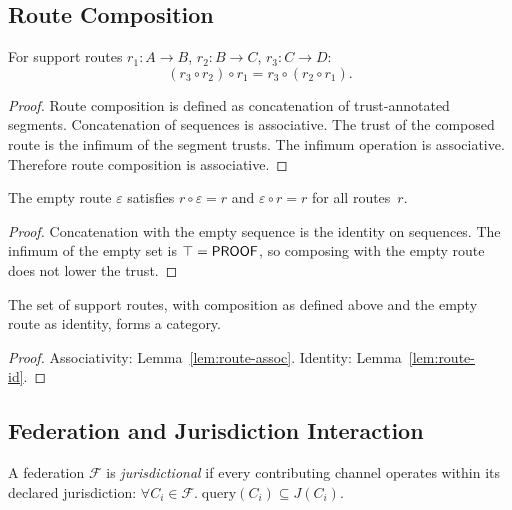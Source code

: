 \documentclass[11pt]{article}
\begin{document}
\subsection{Route Composition}
\label{app:route-comp}

\begin{lemma}
\label{lem:route-assoc}
For support routes $r_1 : A \to B$, $r_2 : B \to C$, $r_3 : C \to D$:
\[
  (r_3 \circ r_2) \circ r_1 = r_3 \circ (r_2 \circ r_1).
\]
\end{lemma}

\begin{proof}
Route composition is defined as concatenation of trust-annotated
segments.  Concatenation of sequences is associative.  The trust
of the composed route is the infimum of the segment trusts.  The
infimum operation is associative.  Therefore route composition is
associative.
\end{proof}

\begin{lemma}
\label{lem:route-id}
The empty route $\varepsilon$ satisfies $r \circ \varepsilon = r$
and $\varepsilon \circ r = r$ for all routes~$r$.
\end{lemma}

\begin{proof}
Concatenation with the empty sequence is the identity on sequences.
The infimum of the empty set is $\top = \mathsf{PROOF}$, so composing
with the empty route does not lower the trust.
\end{proof}

\begin{corollary}
\label{cor:route-cat}
The set of support routes, with composition as defined above and
the empty route as identity, forms a category.
\end{corollary}

\begin{proof}
Associativity: Lemma~\ref{lem:route-assoc}.
Identity: Lemma~\ref{lem:route-id}.
\end{proof}

\subsection{Federation and Jurisdiction Interaction}
\label{app:fed-juris}

\begin{definition}
\label{def:juris-fed}
A federation $\mathcal{F}$ is \emph{jurisdictional} if every
contributing channel operates within its declared jurisdiction:
$\forall C_i \in \mathcal{F}.\; \mathrm{query}(C_i) \subseteq J(C_i)$.
\end{definition}
\end{document}
